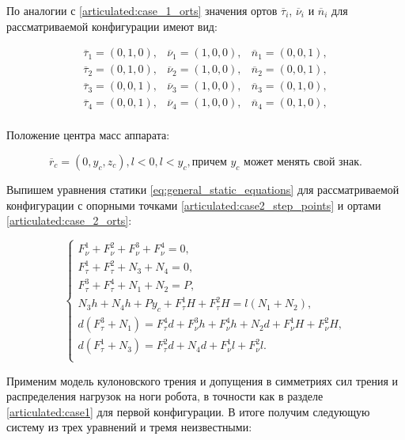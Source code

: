 По аналогии с \ref{articulated:case_1_orts} значения ортов $\overline{\tau}_i$, $\overline{\nu}_i$ и $\overline{n}_i$ для рассматриваемой конфигурации имеют вид:

\begin{equation}
\label{articulated:case_2_orts}
\begin{alignedat}{3}
  \overline{\tau}_1 = (0,1,0),&\overline{\nu}_1 = (1,0,0),&\overline{n}_1 = (0,0,1),\\
  \overline{\tau}_2 = (0,1,0),&\overline{\nu}_2 = (1,0,0),&\overline{n}_2 = (0,0,1),\\
  \overline{\tau}_3 = (0,0,1),&\overline{\nu}_3 = (1,0,0),&\overline{n}_3 = (0,1,0),\\
  \overline{\tau}_4 = (0,0,1),&\overline{\nu}_4 = (1,0,0),&\overline{n}_4 = (0,1,0),\\
\end{alignedat}
\end{equation}

Положение центра масс аппарата:

\begin{equation}
\label{articulated:case_2_center_of_gravity}
  \overline{r}_c = (0, y_c, z_c), l < 0, l < y_c,  \text{причем }y_c\text{ может менять свой знак.}
\end{equation}

Выпишем уравнения статики \ref{eq:general_static_equations} для рассматриваемой конфигурации с опорными точками \ref{articulated:case2_step_points} и ортами \ref{articulated:case_2_orts}:

\begin{equation}
  \label{articulated:case2_initial}
\left\{
  \begin{alignedat}{3}
    F_\nu^1 + F_\nu^2 + F_\nu^3 + F_\nu^4 = 0,\\
    F_\tau^1 + F_\tau^2 + N_3 + N_4 = 0,\\
    F_\tau^3 + F_\tau^4 + N_1 + N_2 = P,\\
    N_3 h + N_4 h + P y_c + F_\tau^1 H + F_\tau^2 H = l (N_1 + N_2),\\
    d (F_\tau^3 + N_1) = F_\tau^4 d + F_\nu^3 h + F_\nu^4 h + N_2 d + F_\nu^1 H + F_\nu^2 H,\\
    d (F_\tau^1 + N_3) = F_\tau^2 d + N_4 d + F_\nu^1 l + F_\nu^2 l.\\
  \end{alignedat}
\right.
\end{equation}

 Применим модель кулоновского трения и допущения в симметриях сил трения и распределения нагрузок на ноги робота, в точности как в разделе \ref{articulated:case1} для первой конфигурации. В итоге получим следующую систему из трех  уравнений и тремя неизвестными:

